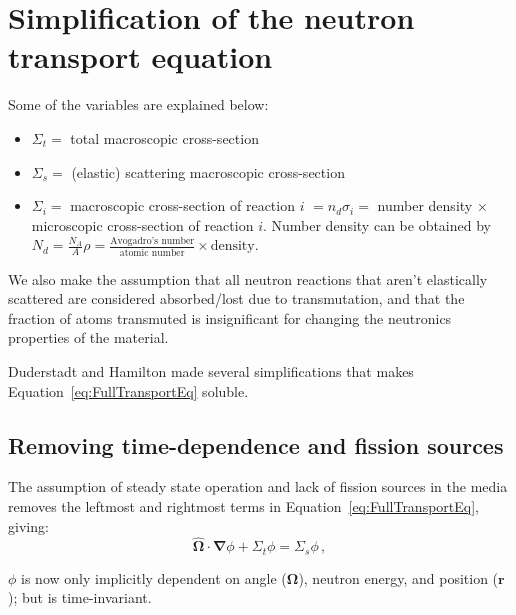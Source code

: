 \documentclass[a4paper, 12pt]{article}
\newcommand{\ve}[1]{\boldsymbol{#1}}
\begin{document}
\section{Simplification of the neutron transport equation}
Some of the variables are explained below:
\begin{itemize}
    \item $\Sigma_t = $ total macroscopic cross-section
    \item $\Sigma_s = $ (elastic) scattering macroscopic cross-section
    \item $\Sigma_i = $ macroscopic cross-section of reaction $i$ $= n_d \sigma_i = $ number density $\times$ microscopic cross-section of reaction $i$. Number density can be obtained by $N_d=\frac{N_A}{A}\rho=\frac{\text{Avogadro's number}}{\text{atomic number}}\times\text{density}$.
\end{itemize}

We also make the assumption that all neutron reactions that aren't elastically scattered are considered absorbed/lost due to transmutation, and that the fraction of atoms transmuted is insignificant for changing the neutronics properties of the material.

Duderstadt and Hamilton made several simplifications that makes Equation~\ref{eq:FullTransportEq} soluble.

\subsection{Removing time-dependence and fission sources}
The assumption of steady state operation and lack of fission sources in the media removes the leftmost and rightmost terms in Equation~\ref{eq:FullTransportEq}, giving:
\begin{equation}\label{eq:TransportEq3Terms}
    \hat{\ve{\Omega}}\cdot\ve{\nabla}\phi + \Sigma_t \phi =\Sigma_s \phi\,,
\end{equation}

$\phi$ is now only implicitly dependent on angle ($\ve{\Omega}$), neutron energy, and position ($\ve{r}$); but is time-invariant.
\end{document}
